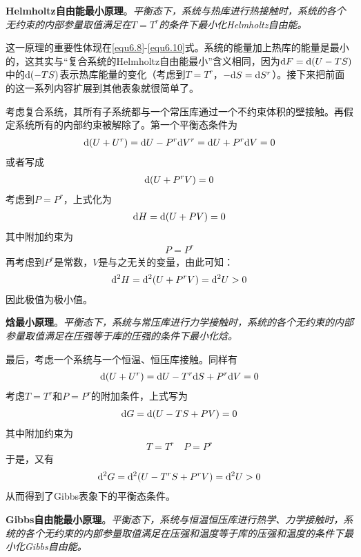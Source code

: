 {\bf Helmholtz自由能最小原理}。{\it 平衡态下，系统与热库进行热接触时，系统的各个无约束的内部参量取值满足在$T=T^r$的条件下最小化Helmholtz自由能。}

这一原理的重要性体现在\eqref{equ6.8}-\eqref{equ6.10}式。系统的能量加上热库的能量是最小的，这其实与“复合系统的Helmholtz自由能最小”含义相同，因为$\mathrm{d} F = \mathrm{d} (U - TS)$中的$\mathrm{d} (-TS)$表示热库能量的变化（考虑到$T = T^r$，$-\mathrm{d} S = \mathrm{d} S^r$）。接下来把前面的这一系列内容扩展到其他表象就很简单了。

考虑复合系统，其所有子系统都与一个常压库通过一个不约束体积的壁接触。再假定系统所有的内部约束被解除了。第一个平衡态条件为
\begin{align}\label{equ6.14}
	\mathrm{d} (U + U^r) = \mathrm{d} U - P^r \mathrm{d} V^r = \mathrm{d} U + P^r \mathrm{d} V = 0
\end{align}
或者写成
\begin{align}\label{equ6.15}
	\mathrm{d} (U + P^r V) = 0
\end{align}
考虑到$P=P^r$，上式化为
\begin{align}\label{equ6.16}
	\mathrm{d} H = \mathrm{d} (U + PV) = 0
\end{align}
其中附加约束为
\begin{align}\label{equ6.17}
	P = P^r
\end{align}
再考虑到$P^r$是常数，$V$是与之无关的变量，由此可知：
\begin{align}\label{equ6.18}
	\mathrm{d}^2 H = \mathrm{d}^2 (U + P^r V) = \mathrm{d}^2 U > 0
\end{align}
因此极值为极小值。

{\bf 焓最小原理}。{\it 平衡态下，系统与常压库进行力学接触时，系统的各个无约束的内部参量取值满足在压强等于库的压强的条件下最小化焓。}

最后，考虑一个系统与一个恒温、恒压库接触。同样有
\begin{align}\label{equ6.19}
	\mathrm{d} (U + U^r) = \mathrm{d} U - T^r \mathrm{d} S + P^r \mathrm{d} V = 0
\end{align}
考虑$T = T^r$和$P = P^r$的附加条件，上式写为
\begin{align}\label{equ6.20}
	\mathrm{d} G = \mathrm{d} (U - TS + PV) = 0
\end{align}
其中附加约束为
\begin{align}\label{equ6.21}
	T = T^r \quad P = P^r
\end{align}
于是，又有
\begin{align}\label{equ6.22}
	\mathrm{d}^2 G = \mathrm{d}^2 (U - T^r S + P^r V) = \mathrm{d}^2 U > 0
\end{align}
从而得到了Gibbs表象下的平衡态条件。

{\bf Gibbs自由能最小原理}。{\it 平衡态下，系统与恒温恒压库进行热学、力学接触时，系统的各个无约束的内部参量取值满足在压强和温度等于库的压强和温度的条件下最小化Gibbs自由能。}

